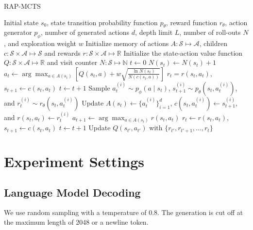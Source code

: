 \begin{algorithm*}[t]
\centering
\caption{RAP-MCTS}\label{alg:mcts}
\begin{minipage}{0.9\linewidth} 
\small
\begin{algorithmic}[1]
    \Require Initial state $s_0$, state transition probability function $p_\theta$, reward function $r_\theta$, action generator $p_\phi$, number of generated actions $d$, depth limit $L$, number of roll-outs $N$, and exploration weight $w$
    \State Initialize memory of actions $A : \mathcal S \mapsto \mathcal A$, children $c : \mathcal S \times \mathcal A \mapsto \mathcal S$ 
    and rewards $r : \mathcal S \times \mathcal A \mapsto \mathbb R$ \State Initialize the state-action value function $Q : \mathcal S \times \mathcal A \mapsto \mathbb R$ and visit counter $N : \mathcal S \mapsto \mathbb N$
        \State $t \gets 0$
         
            \State $N(s_t) \gets N(s_t) + 1$
            \State $a_t \gets \arg\max_{a \in A(s_t)} \left[ Q(s_t, a) + w \sqrt{\frac{\ln N(s_t)}{N(c(s_t, a))}} \right]$
            \State $r_t = r(s_t, a_t)$, $s_{t+1} \gets c(s_t, a_t)$
            \State $t \gets t + 1$
        \EndWhile
             
                \State Sample $a_t^{(i)} \sim p_\phi(a \mid s_t)$, $s_{t+1}^{(i)} \sim p_\theta(s_t, a_t^{(i)})$, and $r_t^{(i)} \sim r_\theta(s_t, a_t^{(i)})$
                \State Update $A(s_t) \gets \{a_t^{(i)}\}_{i=1}^d$, $c(s_t, a_t^{(i)}) \gets s_{t+1}^{(i)}$, and $r(s_t, a_t) \gets r_t^{(i)}$
            \EndFor
            \State $a_{t+1} \gets \arg \max_{a \in A(s_t)} r(s_t, a_t)$ 
            \State $r_t \gets r(s_t, a_t)$, $s_{t+1} \gets c(s_t, a_t)$
            \State $t \gets t + 1$
        \EndWhile
         
            \State Update $Q(s_{t'}, a_{t'})$ with $\{r_{t'}, r_{t'+1}, \dots, r_t\}$
        \EndFor
    \EndFor
\end{algorithmic}
\end{minipage}
\end{algorithm*}

\section{Experiment Settings}
\label{sec:details}
\subsection{Language Model Decoding}
We use random sampling with a temperature of 0.8. The generation is cut off at the maximum length of 2048 or a newline token.

